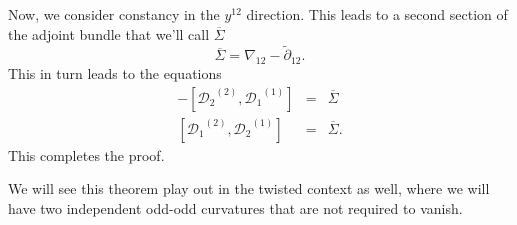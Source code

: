 \documentclass[twoside]{amsart}
\newcommand{\enm}[1]{\ensuremath{#1}}
\renewcommand{\bar}[1]{\overline{#1}}
\newcommand{\ditil}[1]{\enm{\tilde{\partial}_{#1}}}
\newcommand{\onetwoij}[2]{\enm{#1^{(#2)}}}
\newcommand{\dicov}[1]{\enm{\nabla_{#1}}}
\newcommand{\odicov}[1]{\enm{\mathcal{D}_{#1}}}
\begin{document}
Now, we consider constancy in the \( y^{12} \) direction.  This leads
to a second section of the adjoint bundle that we'll call \(
\bar{\Sigma} \)
\[ \bar{\Sigma} = \dicov{12} - \ditil{12}. \]
This in turn leads to the equations
\begin{eqnarray}
    -\left[\onetwoij{\odicov{2}}{2}, \onetwoij{\odicov{1}}{1}\right]
& = &
    \bar{\Sigma} \label{eq:sigma3} \\
    \left[\onetwoij{\odicov{1}}{2}, \onetwoij{\odicov{2}}{1}\right] &
= &
    \bar{\Sigma} \label{eq:sigma4}.
\end{eqnarray}
This completes the proof.

We will see this theorem play out in the twisted context as well,
where we will have two independent odd-odd curvatures that are not
required to vanish.

\end{document}

